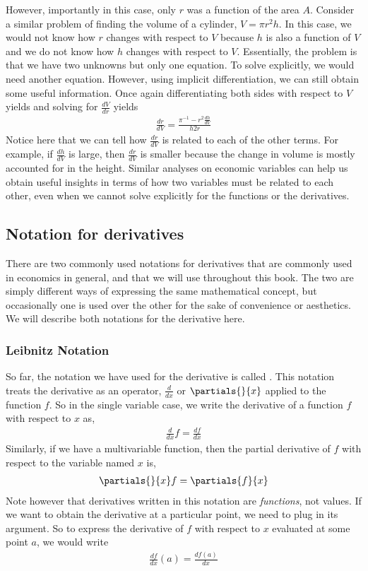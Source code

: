 However, importantly in this case, only $r$ was a function of the area $A$. Consider a similar problem of finding the volume of a cylinder, $V = \pi r^2 h$. In this case, we would not know how $r$ changes with respect to $V$ because $h$ is also a function of $V$ and we do not know how $h$ changes with respect to $V$. Essentially, the problem is that we have two unknowns but only one equation. To solve explicitly, we would need another equation. However, using implicit differentiation, we can still obtain some useful information. Once again differentiating both sides with respect to $V$ yields and solving for $\frac{dV}{dr}$ yields
\begin{align*}
    \frac{dr}{dV} = \frac{\pi^{-1} - r^2 \frac{dh}{dV}}{h2r}
\end{align*}
Notice here that we can tell how $\frac{dr}{dV}$ is related to each of the other terms. For example, if $\frac{dh}{dV}$ is large, then $\frac{dr}{dV}$ is smaller because the change in volume is mostly accounted for in the height. Similar analyses on economic variables can help us obtain useful insights in terms of how two variables must be related to each other, even when we cannot solve explicitly for the functions or the derivatives. 

\subsection*{Notation for derivatives}
There are two commonly used notations for derivatives that are commonly used in economics in general, and that we will use throughout this book. The two are simply different ways of expressing the same mathematical concept, but occasionally one is used over the other for the sake of convenience or aesthetics. We will describe both notations for the derivative here.

\subsubsection*{Leibnitz Notation}
So far, the notation we have used for the derivative is called . This notation treats the derivative as an operator, $\frac{d}{dx}$ or $\partials{}{x}$ applied to the function $f$. So in the single variable case, we write the derivative of a function $f$ with respect to $x$ as,
\begin{align*}
    \frac{d}{dx} f = \frac{df}{dx}
\end{align*}
Similarly, if we have a multivariable function, then the partial derivative of $f$ with respect to the variable named $x$ is,
\begin{align*}
    \partials{}{x} f = \partials{f}{x}
\end{align*}
Note however that derivatives written in this notation are \emph{functions}, not values. If we want to obtain the derivative at a particular point, we need to plug in its argument. So to express the derivative of $f$ with respect to $x$ evaluated at some point $a$, we would write
\begin{align*}
    \frac{df}{dx}(a) = \frac{df(a)}{dx}
\end{align*}

